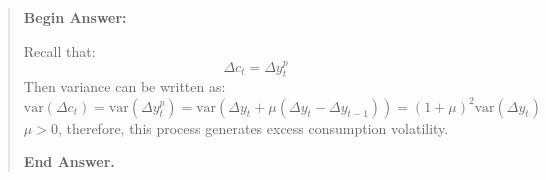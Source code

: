 \begin{exercise}
\begin{enumerate}
\begin{quote}
{\bf Begin Answer: }

Recall that:
\begin{equation*}
\Delta c_t = \Delta y_t^p
\end{equation*}
Then variance can be written as:
\begin{equation*}
\text{var}(\Delta c_t) = \text{var}(\Delta y_t^p) = \text{var}(\Delta y_t + \mu (\Delta y_t-\Delta y_{t-1})) = (1+\mu)^2 \text{var}(\Delta y_t)
\end{equation*}
$\mu>0$, therefore, this process generates excess consumption volatility.

{\bf End Answer.}
\end{quote}
\end{enumerate}
\end{exercise} 





